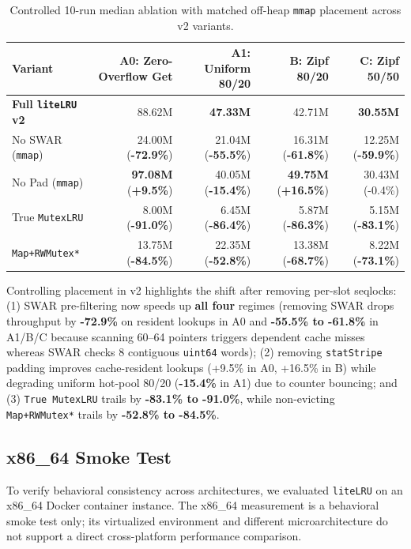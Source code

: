 \documentclass[11pt,a4paper]{article}
\begin{document}
\begin{table}[h]
\centering
\begin{tabular}{@{}lrrrr@{}}
\toprule
\textbf{Variant} & \textbf{A0: Zero-Overflow Get} & \textbf{A1: Uniform 80/20} & \textbf{B: Zipf 80/20} & \textbf{C: Zipf 50/50} \\ \midrule
\textbf{Full \texttt{liteLRU} v2} & 88.62M & \textbf{47.33M} & 42.71M & \textbf{30.55M} \\
No SWAR (\texttt{mmap}) & 24.00M (\textbf{-72.9\%}) & 21.04M (\textbf{-55.5\%}) & 16.31M (\textbf{-61.8\%}) & 12.25M (\textbf{-59.9\%}) \\
No Pad (\texttt{mmap}) & \textbf{97.08M} (\textbf{+9.5\%}) & 40.05M (\textbf{-15.4\%}) & \textbf{49.75M} (\textbf{+16.5\%}) & 30.43M (-0.4\%) \\
True \texttt{MutexLRU} & 8.00M (\textbf{-91.0\%}) & 6.45M (\textbf{-86.4\%}) & 5.87M (\textbf{-86.3\%}) & 5.15M (\textbf{-83.1\%}) \\
\texttt{Map+RWMutex*} & 13.75M (\textbf{-84.5\%}) & 22.35M (\textbf{-52.8\%}) & 13.38M (\textbf{-68.7\%}) & 8.22M (\textbf{-73.1\%}) \\ \bottomrule
\end{tabular}
\caption{Controlled 10-run median ablation with matched off-heap \texttt{mmap} placement across v2 variants.}
\end{table}

Controlling placement in v2 highlights the shift after removing per-slot seqlocks: (1) SWAR pre-filtering now speeds up \textbf{all four} regimes (removing SWAR drops throughput by \textbf{-72.9\%} on resident lookups in A0 and \textbf{-55.5\% to -61.8\%} in A1/B/C because scanning 60--64 pointers triggers dependent cache misses whereas SWAR checks 8 contiguous \texttt{uint64} words); (2) removing \texttt{statStripe} padding improves cache-resident lookups (+9.5\% in A0, +16.5\% in B) while degrading uniform hot-pool 80/20 (\textbf{-15.4\%} in A1) due to counter bouncing; and (3) \texttt{True MutexLRU} trails by \textbf{-83.1\% to -91.0\%}, while non-evicting \texttt{Map+RWMutex*} trails by \textbf{-52.8\% to -84.5\%}.

\subsection{x86\_64 Smoke Test}

To verify behavioral consistency across architectures, we evaluated \texttt{liteLRU} on an x86\_64 Docker container instance. The x86\_64 measurement is a behavioral smoke test only; its virtualized environment and different microarchitecture do not support a direct cross-platform performance comparison.
\end{document}

